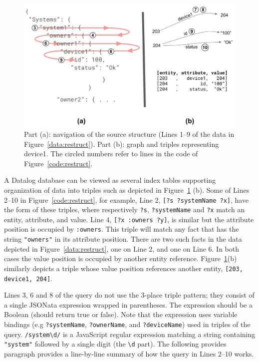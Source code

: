 \documentclass[9pt,letterpaper]{article}
\newcommand{\stt}[1]{\texttt{#1}} %
\begin{document}
\begin{figure}[H]
  \caption{Part (a): navigation of the source structure (Lines 1--9 of the data in Figure~\ref{data:restruct}).
    Part (b): graph and triples representing device1.
    The circled numbers refer to lines in the code of Figure~\ref{code:restruct}.}\label{fig:hairpin}
   \includegraphics[scale=0.15]{hairpin-two-part.jpg}
  \centering
\end{figure}

A Datalog database can be viewed as several index tables supporting organization of data into triples such as depicted in Figure~\ref{fig:hairpin} (b).
Some of Lines 2--10 in Figure~\ref{code:restruct}, for example, Line 2, \stt{[?s ?systemName ?x]}, have the form of these triples, where respectively \stt{?s}, \stt{?systemName} and \stt{?x} match an entity, attribute, and value.
Line 4, \stt{[?x :owners ?y]}, is similar but the attribute position is occupied by \stt{:owners}.
This triple will match any fact that has the string \stt{"owners"} in its attribute position.
There are two such facts in the data depicted in Figure~\ref{data:restruct}, one on Line 2, and one on Line 6.
In both cases the value position is occupied by another entity reference.
Figure~\ref{fig:hairpin}(b) similarly depicts a triple whose value position references another entity, \stt{[203, device1, 204]}.

Lines 3, 6 and 8 of the query do not use the 3-place triple pattern; they consist of a single JSONata expression wrapped in parentheses.
The expression should be a Boolean (should return true or false).
 Note that the expression uses variable bindings (e.g \stt{?systemName}, \stt{?ownerName}, and \stt{?deviceName}) used in triples of the query.
 \stt{/system\textbackslash d/} is a JavaScript regular expression matching a string containing \stt{"system"} followed by a single digit (the \stt{\textbackslash d} part).
The following provides paragraph provides a line-by-line summary of how the query in Lines 2--10 works.
\end{document}
